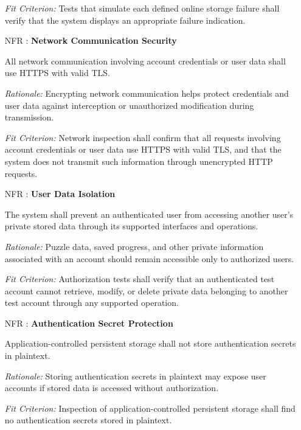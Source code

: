 \documentclass[12pt]{article}
\newcounter{nfrnum} %
\begin{document}
\begin{itemize}
\textit{Fit Criterion:} Tests that simulate each defined
online storage failure shall verify that the system displays
an appropriate failure indication.



\item[NFR\refstepcounter{nfrnum}\thenfrnum
\label{NFR_14}:]
\textbf{Network Communication Security}

All network communication involving account credentials
or user data shall use HTTPS with valid TLS.

\textit{Rationale:} Encrypting network communication helps
protect credentials and user data against interception or
unauthorized modification during transmission.

\textit{Fit Criterion:} Network inspection shall confirm that
all requests involving account credentials or user data use
HTTPS with valid TLS, and that the system does not transmit
such information through unencrypted HTTP requests.


\item[NFR\refstepcounter{nfrnum}\thenfrnum
\label{NFR_15}:]
\textbf{User Data Isolation}

The system shall prevent an authenticated user from accessing
another user's private stored data through its supported
interfaces and operations.

\textit{Rationale:} Puzzle data, saved progress, and other
private information associated with an account should remain
accessible only to authorized users.

\textit{Fit Criterion:} Authorization tests shall verify that
an authenticated test account cannot retrieve, modify, or
delete private data belonging to another test account through
any supported operation.


\item[NFR\refstepcounter{nfrnum}\thenfrnum
\label{NFR_16}:]
\textbf{Authentication Secret Protection}

Application-controlled persistent storage shall not store
authentication secrets in plaintext.

\textit{Rationale:} Storing authentication secrets in plaintext
may expose user accounts if stored data is accessed without
authorization.

\textit{Fit Criterion:} Inspection of application-controlled
persistent storage shall find no authentication secrets
stored in plaintext.



\end{itemize}
\end{document}
